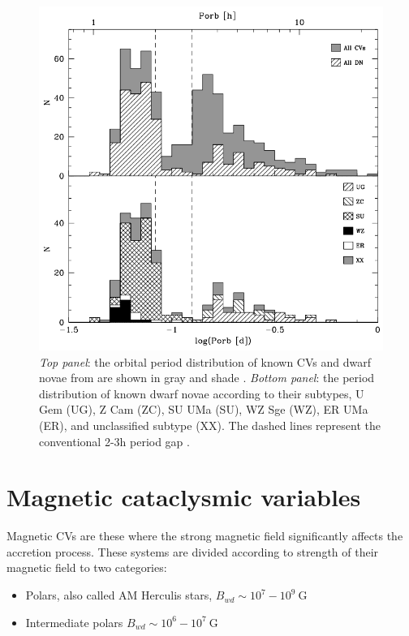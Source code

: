 \documentclass[oneside,a4paper,11pt]{report}
\begin{document}
\begin{figure}[hbt!]
\centering
\includegraphics[totalheight=12.5cm]{plot/cv_orbper.png}
\caption{\textit{Top panel}: the orbital period distribution of known CVs and dwarf novae from are shown in gray and 
shade \citet{2003A&A...404..301R}. \textit{Bottom panel}: the period distribution of known dwarf novae according to their subtypes, U Gem (UG), 
Z Cam (ZC), SU UMa (SU), WZ Sge (WZ), ER UMa (ER), and unclassified subtype (XX). The dashed lines represent the conventional 
2-3h period gap \citet{Aungwerojwit}.}
\label{cv_orb1} 
\end{figure}

\section{Magnetic cataclysmic variables}
Magnetic CVs are these where the strong magnetic field significantly affects the accretion process. These systems are divided 
according to strength of their magnetic field to two categories: 
\begin{itemize}
 \item Polars, also called AM Herculis stars, $B_{wd} \sim 10^7 - 10^9\: \mathrm{G}$  
 \item Intermediate polars $B_{wd} \sim 10^6 - 10^7 \: \mathrm{G}$
\end{itemize}
\end{document}
